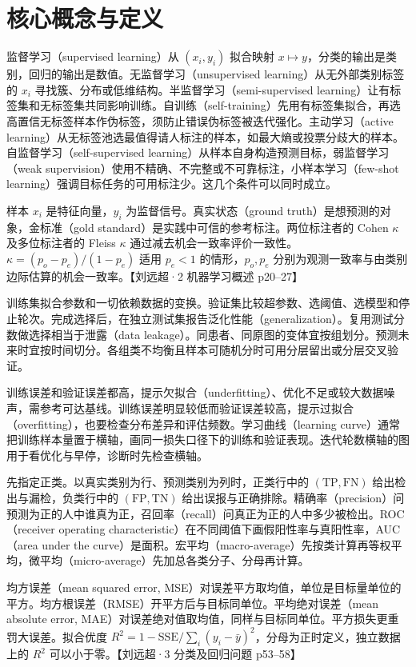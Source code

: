 \documentclass[UTF8,a4paper,zihao=-4,fontset=fandol]{ctexrep}
\begin{document}
\section{核心概念与定义}
\begin{description}[leftmargin=2em,style=nextline]
\item[学习范式] 监督学习（supervised learning）从 \((x_i,y_i)\) 拟合映射 \(x\mapsto y\)，分类的输出是类别，回归的输出是数值。无监督学习（unsupervised learning）从无外部类别标签的 \(x_i\) 寻找簇、分布或低维结构。半监督学习（semi-supervised learning）让有标签集和无标签集共同影响训练。自训练（self-training）先用有标签集拟合，再选高置信无标签样本作伪标签，须防止错误伪标签被迭代强化。主动学习（active learning）从无标签池选最值得请人标注的样本，如最大熵或投票分歧大的样本。自监督学习（self-supervised learning）从样本自身构造预测目标，弱监督学习（weak supervision）使用不精确、不完整或不可靠标注，小样本学习（few-shot learning）强调目标任务的可用标注少。这几个条件可以同时成立。
\item[样本与标注] 样本 \(x_i\) 是特征向量，\(y_i\) 为监督信号。真实状态（ground truth）是想预测的对象，金标准（gold standard）是实践中可信的参考标注。两位标注者的 Cohen \(\kappa\) 及多位标注者的 Fleiss \(\kappa\) 通过减去机会一致率评价一致性。\(\kappa=(p_o-p_e)/(1-p_e)\) 适用 \(p_e<1\) 的情形，\(p_o,p_e\) 分别为观测一致率与由类别边际估算的机会一致率。【刘远超·2 机器学习概述 p20--27】
\item[评估数据] 训练集拟合参数和一切依赖数据的变换。验证集比较超参数、选阈值、选模型和停止轮次。完成选择后，在独立测试集报告泛化性能（generalization）。复用测试分数做选择相当于泄露（data leakage）。同患者、同原图的变体宜按组划分。预测未来时宜按时间切分。各组类不均衡且样本可随机分时可用分层留出或分层交叉验证。
\item[泛化与诊断] 训练误差和验证误差都高，提示欠拟合（underfitting）、优化不足或较大数据噪声，需参考可达基线。训练误差明显较低而验证误差较高，提示过拟合（overfitting），也要检查分布差异和评估频数。学习曲线（learning curve）通常把训练样本量置于横轴，画同一损失口径下的训练和验证表现。迭代轮数横轴的图用于看优化与早停，诊断时先检查横轴。
\item[分类指标] 先指定正类。以真实类别为行、预测类别为列时，正类行中的 \((\mathrm{TP},\mathrm{FN})\) 给出检出与漏检，负类行中的 \((\mathrm{FP},\mathrm{TN})\) 给出误报与正确排除。精确率（precision）问预测为正的人中谁真为正，召回率（recall）问真正为正的人中多少被检出。ROC（receiver operating characteristic）在不同阈值下画假阳性率与真阳性率，AUC（area under the curve）是面积。宏平均（macro-average）先按类计算再等权平均，微平均（micro-average）先加总各类分子、分母再计算。
\item[回归指标] 均方误差（mean squared error, MSE）对误差平方取均值，单位是目标量单位的平方。均方根误差（RMSE）开平方后与目标同单位。平均绝对误差（mean absolute error, MAE）对误差绝对值取均值，同样与目标同单位。平方损失更重罚大误差。拟合优度 \(R^2=1-\mathrm{SSE}/\sum_i(y_i-\bar y)^2\)，分母为正时定义，独立数据上的 \(R^2\) 可以小于零。【刘远超·3 分类及回归问题 p53--58】
\end{description}
\end{document}
